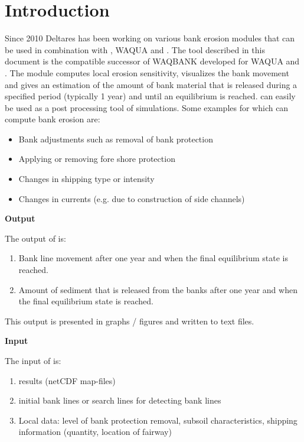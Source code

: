\chapter{Introduction}

Since 2010 Deltares has been working on various bank erosion modules that can be used in combination with \dflow, WAQUA and \dflowfm.
The \dfastbe tool described in this document is the \dflowfm compatible successor of WAQBANK developed for WAQUA and \dflow.
The module computes local erosion sensitivity, visualizes the bank movement and gives an estimation of the amount of bank material that is released during a specified period (typically 1 year) and until an equilibrium is reached.
\dfastbe can easily be used as a post processing tool of \dflowfm simulations.
Some examples for which \dfastbe can compute bank erosion are:

\begin{itemize}
\item Bank adjustments such as removal of bank protection
\item Applying or removing fore shore protection
\item Changes in shipping type or intensity
\item Changes in currents (e.g. due to construction of side channels)
\end{itemize}

\textbf{Output}

The output of \dfastbe is:

\begin{enumerate}
\item Bank line movement after one year and when the final equilibrium state is reached.
\item Amount of sediment that is released from the banks after one year and when the final equilibrium state is reached.
\end{enumerate}

This output is presented in graphs / figures and written to text files.

\textbf{Input}

The input of \dfastbe is:

\begin{enumerate}
\item \dflowfm results (netCDF map-files)
\item initial bank lines or search lines for detecting bank lines
\item Local data: level of bank protection removal, subsoil characteristics, shipping information (quantity, location of fairway)
\end{enumerate}


